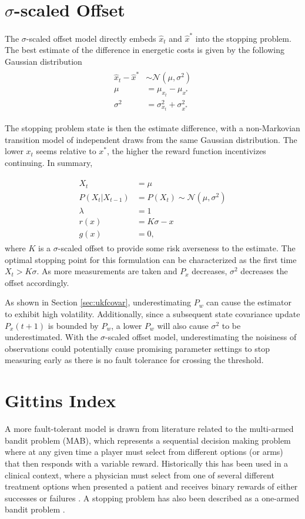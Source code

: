 \section{$\sigma$-scaled Offset}
The $\sigma$-scaled offset model directly embeds $\hat{x}_t$ and $\hat{x}^*$ into the stopping problem. The best estimate of the difference in energetic costs is given by the following Gaussian distribution
\begin{align}
\begin{split}
  \hat{x}_t - \hat{x}^* &\sim \mathcal{N}(\mu, \sigma^2)\\
  \mu &= \mu_{x_t} - \mu_{x^*}\\
  \sigma^2 &= \sigma^2_{x_t} + \sigma^2_{x^*}
\end{split}
\end{align}

The stopping problem state is then the estimate difference, with a non-Markovian transition model of independent draws from the same Gaussian distribution. The lower $x_t$ seems relative to $x^*$, the higher the reward function incentivizes continuing. In summary,

\begin{align}
\begin{split}
  X_t &= \mu\\
  P(X_t \vert X_{t-1}) &= P(X_t) \sim \mathcal{N}(\mu, \sigma^2)\\
  \lambda &= 1\\
  r(x) &= K\sigma-x\\
  g(x) &= 0,
\end{split}
\end{align}
where $K$ is a $\sigma$-scaled offset to provide some risk averseness to the estimate. The optimal stopping point for this formulation can be characterized as the first time $X_t > K\sigma$. As more measurements are taken and $P_{x}$ decreases, $\sigma^2$ decreases the offset accordingly.

As shown in Section \ref{sec:ukfcovar}, underestimating $P_w$ can cause the estimator to exhibit high volatility. Additionally, since a subsequent state covariance update $P_x(t+1)$ is bounded by $P_w$, a lower $P_w$ will also cause $\sigma^2$ to be underestimated. With the $\sigma$-scaled offset model, underestimating the noisiness of observations could potentially cause promising parameter settings to stop measuring early as there is no fault tolerance for crossing the threshold. 

\section{Gittins Index}
A more fault-tolerant model is drawn from literature related to the multi-armed bandit problem (MAB), which represents a sequential decision making problem where at any given time a player must select from different options (or arms) that then responds with a variable reward. Historically this has been used in a clinical context, where a physician must select from one of several different treatment options when presented a patient and receives binary rewards of either successes or failures \citep{Villar2015}. A stopping problem has also been described as a one-armed bandit problem \citep{gelman2004bayesian}.

